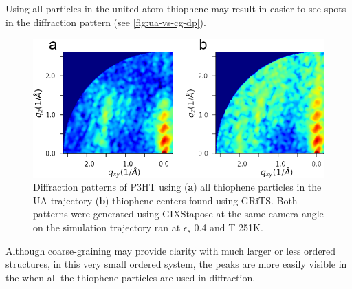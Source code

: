 Using all particles in the united-atom thiophene may result in easier to see spots in the diffraction pattern (see \autoref{fig:ua-vs-cg-dp}).
\begin{figure}
    \centering
    \includegraphics[width=0.8\linewidth]{figures/p3ht_val/ua_vs_cg_dp.png}
    \caption{Diffraction patterns of P3HT using (\textbf{a}) all thiophene particles in the UA trajectory (\textbf{b}) thiophene centers found using GRiTS. Both patterns were generated using GIXStapose at the same camera angle on the simulation trajectory ran at $\epsilon_{s}$ 0.4 and T 251K.}\label{fig:ua-vs-cg-dp}
\end{figure}
Although coarse-graining may provide clarity with much larger or less ordered structures, in this very small ordered system, the peaks are more easily visible in the when all the thiophene particles are used in diffraction.

